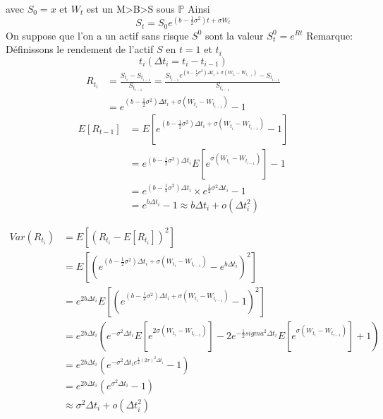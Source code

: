 \documentclass{article}
\begin{document}
avec $S_0=x$ et $W_t$ est un M>B>S sous $\mathbb{P}$
Ainsi
\begin{equation}
S_t=S_0e^{(b-\frac{1}{2}\sigma^2)t+\sigma W_t}
\end{equation}
On suppose que l'on a un actif sans risque $S^0$ sont la valeur $S_t^0=e^{Rt}$
Remarque:
D\'efinissons le rendement de l'actif $S$ en $t=1$ et $t_i$
\begin{equation}
t_i(\Delta t_i=t_i-t_{i-1})
\end{equation}
\begin{equation}
\begin{split}
R_{t_i}&=\frac{S_{t_i}-S_{t_{i-1}}}{S_{t_{i-1}}}=\frac{S_{t_{i-1}}e^{(b-\frac{1}{2}\sigma^2)\Delta t_i+\sigma(W_{t_i}-W_{t_{i-1}})}-S_{t_{i-1}}}{S_{t_{i-1}}}\\
&=e^{(b-\frac{1}{2}\sigma^2)\Delta t_i+\sigma(W_{t_i}-W_{t_{i-1}})}-1
\end{split}
\end{equation}
\begin{equation}
\begin{split}
E[R_{t-1}]&=E[e^{(b-\frac{1}{2}\sigma^2)\Delta t_i+\sigma(W_{t_i}-W_{t_{i-1}})}-1]\\
&=e^{(b-\frac{1}{2}\sigma^2)\Delta t_i} E[e^{\sigma(W_{t_i}-W_{t_{i-1}})}]-1\\
&=e^{(b-\frac{1}{2}\sigma^2)\Delta t_i}\times e^{\frac{1}{2}\sigma^2\Delta t_i}-1\\
&=e^{b\Delta t_i}-1\approx b\Delta t_i+o(\Delta t_i^2)
\end{split}
\end{equation}

\begin{equation}
\begin{split}
Var(R_{t_i})&=E[(R_{t_i}-E[R_{t_i}])^2]\\
&=E[(e^{(b-\frac{1}{2}\sigma^2)\Delta t_i+\sigma(W_{t_i}-W_{t_{i-1}})}-e^{b\Delta t_i})^2]\\
&=e^{2b\Delta t_i}E[(e^{(b-\frac{1}{2}\sigma^2)\Delta t_i+\sigma(W_{t_i}-W_{t_{i-1}})}-1)^2]\\
&=e^{2b\Delta t_i}(e^{-\sigma^2\Delta t_i}E[e^{2\sigma (W_{t_i}-W_{t_{i-1}})}]-2e^{-\frac{1}{2}sigma^2\Delta t_i}E[e^{\sigma (W_{t_i}-W_{t_{i-1}})}]+1)\\
&=e^{2b\Delta t_i}(e^{-\sigma^2\Delta t_i e^{\frac{1}{2}(2\sigma)^2\Delta t_i}}-1)\\
&=e^{2b\Delta t_i}(e^{\sigma^2\Delta t_i}-1)\\
&\approx\sigma^2\Delta t_i+o(\Delta t_i^2)
\end{split}
\end{equation}
\end{document}
